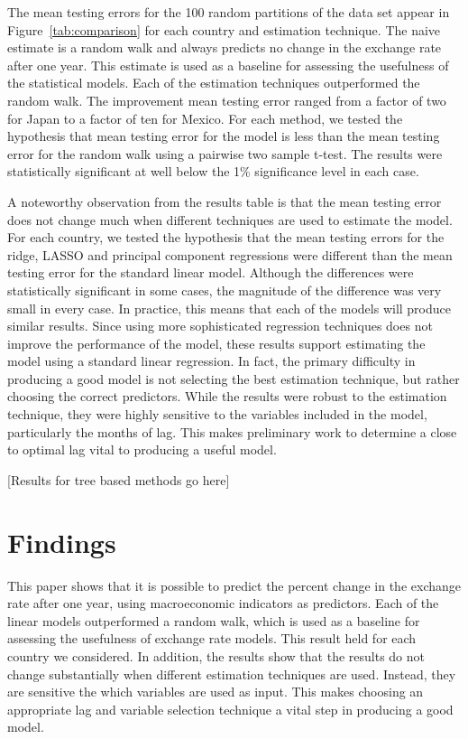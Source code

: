 \documentclass{sig-alternate-05-2015}
\begin{document}
The mean testing errors for the 100 random partitions of the data set appear in Figure~\ref{tab:comparison} for each country and estimation technique. The naive estimate is a random walk and always predicts no change in the exchange rate after one year. This estimate is used as a baseline for assessing the usefulness of the statistical models. Each of the estimation techniques outperformed the random walk. The improvement mean testing error ranged from a factor of two for Japan to a factor of ten for Mexico. For each method, we tested the hypothesis that mean testing error for the model is less than the mean testing error for the random walk using a pairwise two sample t-test. The results were statistically significant at well below the 1\% significance level in each case.
\par{} A noteworthy observation from the results table is that the mean testing error does not change much when different techniques are used to estimate the model. For each country, we tested the hypothesis that the mean testing errors for the ridge, LASSO and principal component regressions were different than the mean testing error for the standard linear model. Although the differences were statistically significant in some cases, the magnitude of the difference was very small in every case. In practice, this means that each of the models will produce similar results. Since using more sophisticated regression techniques does not improve the performance of the model, these results support estimating the model using a standard linear regression. In fact, the primary difficulty in producing a good model is not selecting the best estimation technique, but rather choosing the correct predictors. While the results were robust to the estimation technique, they were highly sensitive to the variables included in the model, particularly the months of lag. This makes preliminary work to determine a close to optimal lag vital to producing a useful model.

[Results for tree based methods go here]

\section{Findings}

This paper shows that it is possible to predict the percent change in the exchange rate after one year, using macroeconomic indicators as predictors. Each of the linear models outperformed a random walk, which is used as a baseline for assessing the usefulness of exchange rate models. This result held for each country we considered. In addition, the results show that the results do not change substantially when different estimation techniques are used. Instead, they are sensitive the which variables are used as input. This makes choosing an appropriate lag and variable selection technique a vital step in producing a good model.
\end{document}
